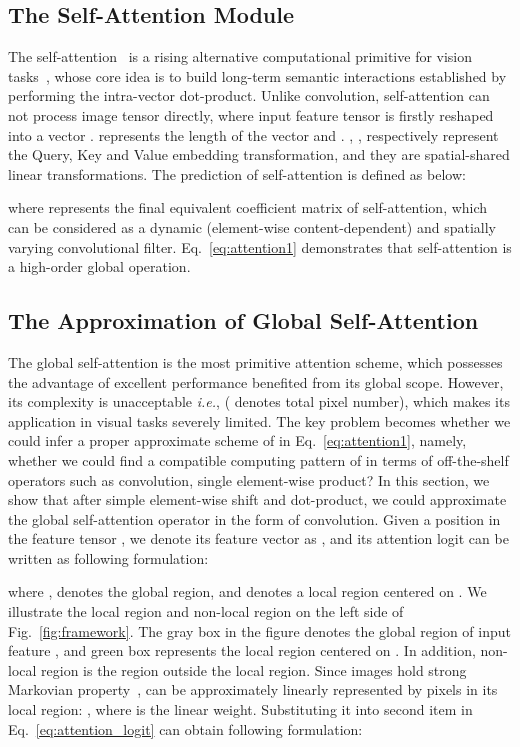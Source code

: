\documentclass{article}
\begin{document}
\subsection{The Self-Attention Module}
The self-attention~\cite{DBLP:conf/nips/VaswaniSPUJGKP17} is a rising alternative computational primitive for vision tasks~\cite{DBLP:journals/corr/abs-2103-12731,DBLP:journals/corr/abs-2103-14030,DBLP:journals/corr/abs-2010-04159,DBLP:conf/eccv/CarionMSUKZ20}, whose core idea is to build long-term semantic interactions established by performing the intra-vector dot-product.
Unlike convolution, self-attention can not process image tensor directly, where input feature tensor is firstly reshaped into a vector {\small}.  represents the length of the vector and {\small}.
{\small,
,
} respectively represent the Query, Key and Value embedding transformation,
and they are spatial-shared linear transformations.
The prediction of self-attention is defined as below:

where {\small} represents the final equivalent coefficient matrix of self-attention, which can be considered as a dynamic (element-wise content-dependent) and spatially varying convolutional filter.
Eq.~\ref{eq:attention1} demonstrates that self-attention is a high-order global operation.

\subsection{The Approximation of Global Self-Attention}
The global self-attention is the most primitive attention scheme, which possesses the advantage of excellent performance benefited from its global scope.
However, its complexity is unacceptable \emph{i.e.},  ( denotes total pixel number), which makes its application in visual tasks severely limited.
The key problem becomes whether we could infer a proper approximate scheme of {\small} in Eq.~\ref{eq:attention1}, namely, whether we could find a compatible computing pattern of {\small} in terms of off-the-shelf operators such as convolution, single element-wise product?
In this section, we show that after simple element-wise shift and dot-product, we could approximate the global self-attention operator in the form of convolution.
Given a position in the feature tensor , we denote its feature vector as , and its attention logit  can be written as following formulation:

where ,  denotes the global region, and  denotes a local region centered on .
We illustrate the local region and non-local region on the left side of Fig.~\ref{fig:framework}.
The gray box in the figure denotes the global region of input feature , and green box represents the local region centered on .
In addition, non-local region is the region outside the local region.
Since images hold strong Markovian property~\cite{krahenbuhl2011efficient},  can be approximately linearly represented by pixels in its local region: {\small},
where  is the linear weight.
Substituting it into second item in Eq.~\ref{eq:attention_logit} can obtain following formulation:
\end{document}
